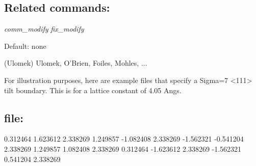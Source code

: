 \documentclass[11pt]{article}
\begin{document}
\subsection{Related commands:}
\emph{comm\_modify}
\emph{fix\_modify}

Default: none

(Ulomek) Ulomek, O'Brien, Foiles, Mohles, ...

For illustration purposes, here are example files that specify a Sigma=7 <111> tilt boundary. This is for a lattice constant of 4.05 Angs.
\subsection{file:}
   0.312464    1.623612    2.338269
   1.249857   -1.082408    2.338269
  -1.562321   -0.541204    2.338269
   1.249857    1.082408    2.338269
   0.312464   -1.623612    2.338269
  -1.562321    0.541204    2.338269
\end{document}
